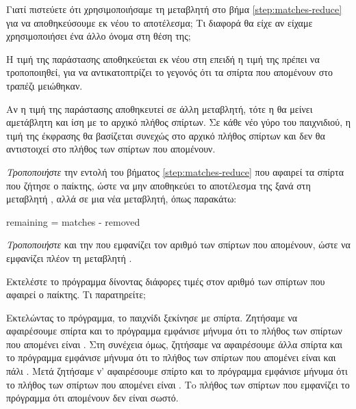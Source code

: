 \documentclass[a4paper,11pt,oneside]{book}
\begin{document}
\begin{step}
Γιατί πιστεύετε ότι χρησιμοποιήσαμε τη μεταβλητή  στο βήμα \ref{step:matches-reduce} για να αποθηκεύσουμε εκ νέου το αποτέλεσμα; Τι διαφορά θα είχε αν είχαμε χρησιμοποιήσει ένα άλλο όνομα στη θέση της;

\begin{answer}
Η τιμή της παράστασης  αποθηκεύεται εκ νέου στη  επειδή η τιμή της πρέπει να τροποποιηθεί, για να αντικατοπτρίζει το γεγονός ότι τα σπίρτα που απομένουν στο τραπέζι μειώθηκαν. 

Αν η τιμή της παράστασης  αποθηκευτεί σε άλλη μεταβλητή, τότε η  θα μείνει αμετάβλητη και ίση με το αρχικό πλήθος σπίρτων. Σε κάθε νέο γύρο του παιχνιδιού, η τιμή της έκφρασης  θα βασίζεται συνεχώς στο αρχικό πλήθος σπίρτων και δεν θα αντιστοιχεί στο πλήθος των σπίρτων που απομένουν.
\end{answer}

\emph{Τροποποιήστε} την εντολή του βήματος \ref{step:matches-reduce} που αφαιρεί τα σπίρτα που ζήτησε ο παίκτης, ώστε να μην αποθηκεύει το αποτέλεσμα της ξανά στη μεταβλητή , αλλά σε μια νέα μεταβλητή, όπως παρακάτω:

\begin{pynew}
remaining = matches - removed
\end{pynew}

\emph{Τροποποιήστε} και την  που εμφανίζει τον αριθμό των σπίρτων που απομένουν, ώστε να εμφανίζει πλέον τη μεταβλητή .

Εκτελέστε το πρόγραμμα δίνοντας διάφορες τιμές στον αριθμό των σπίρτων που αφαιρεί ο παίκτης.
Τι παρατηρείτε;

\begin{answer}
Εκτελώντας το πρόγραμμα, το παιχνίδι ξεκίνησε με  σπίρτα. Ζητήσαμε να αφαιρέσουμε  σπίρτα και το πρόγραμμα εμφάνισε μήνυμα ότι το πλήθος των σπίρτων που απομένει είναι . Στη συνέχεια όμως, ζητήσαμε να αφαιρέσουμε άλλα  σπίρτα και το πρόγραμμα εμφάνισε μήνυμα ότι το πλήθος των σπίρτων που απομένει είναι και πάλι . Μετά ζητήσαμε ν' αφαιρέσουμε  σπίρτο και το πρόγραμμα εμφάνισε μήνυμα ότι το πλήθος των σπίρτων που απομένει είναι . Τo πλήθος των σπίρτων που εμφανίζει το πρόγραμμα ότι απομένουν δεν είναι σωστό.
\end{answer}


\end{step}
\end{document}
